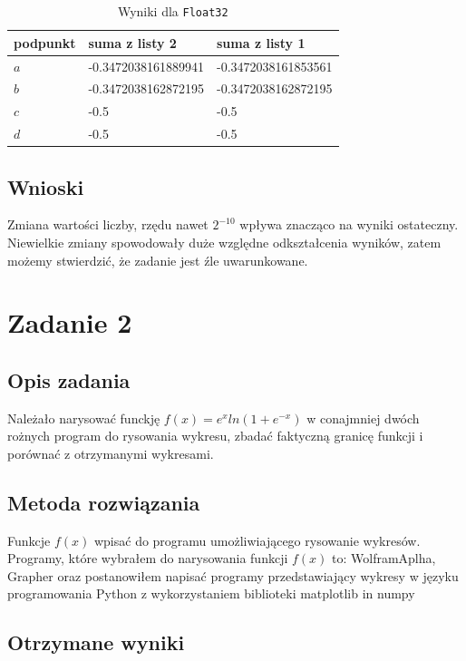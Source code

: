 \documentclass{article}
\begin{document}
\begin{table}[h!]
    \centering
    \begin{tabular}{|l|l|l|}
     \hline
     podpunkt & suma z listy 2 & suma z listy 1 \\
     \hline
     \(a\) & -0.3472038161889941 & -0.3472038161853561  \\ 
     \(b\) & -0.3472038162872195 & -0.3472038162872195 \\
     \(c\) & -0.5 & -0.5 \\
     \(d\) & -0.5 & -0.5 \\
     \hline
    \end{tabular}
    \caption{Wyniki dla \texttt{Float32}}
    \label{table:2}
\end{table}

\subsection{Wnioski}

Zmiana wartości liczby, rzędu nawet \(2^{-10}\) wpływa znacząco na wyniki ostateczny. Niewielkie zmiany spowodowały duże względne odkształcenia wyników, zatem możemy stwierdzić, że zadanie jest źle uwarunkowane.

\section{Zadanie 2}

\subsection{Opis zadania}

Należało narysować funckję \(f(x) = e^x ln (1 + e^{-x})\) w conajmniej dwóch rożnych program do rysowania wykresu, zbadać faktyczną granicę funkcji i porównać z otrzymanymi wykresami.

\subsection{Metoda rozwiązania}

Funkcje \(f(x)\) wpisać do programu umożliwiającego rysowanie wykresów. Programy, które wybrałem do narysowania funkcji \(f(x)\) to: WolframAplha, Grapher oraz postanowiłem napisać programy przedstawiający wykresy w języku programowania Python z wykorzystaniem biblioteki matplotlib in numpy

\subsection{Otrzymane wyniki}
\end{document}
